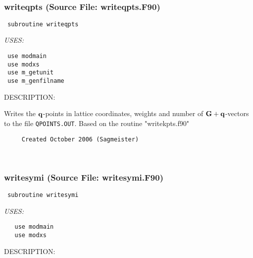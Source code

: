 \documentclass[11pt]{article}
\begin{document}

 
 
\mbox{}\hrulefill\ 
 
\subsubsection{writeqpts (Source File: writeqpts.F90)}


\begin{verbatim} subroutine writeqpts\end{verbatim}{\em USES:}
\begin{verbatim} use modmain
 use modxs
 use m_getunit
 use m_genfilname\end{verbatim}
{\sf DESCRIPTION:\\ }


     Writes the ${\bf q}$-points in lattice coordinates, weights and number of
     ${\bf G+q}$-vectors to the file {\tt QPOINTS.OUT}. Based on the routine 
     "writekpts.f90"
  
\begin{verbatim}     Created October 2006 (Sagmeister)\end{verbatim}






 
 
\mbox{}\hrulefill\ 
 
\subsubsection{writesymi (Source File: writesymi.F90)}


\begin{verbatim} subroutine writesymi\end{verbatim}{\em USES:}
\begin{verbatim}   use modmain
   use modxs\end{verbatim}
{\sf DESCRIPTION:\\ }
\end{document}
